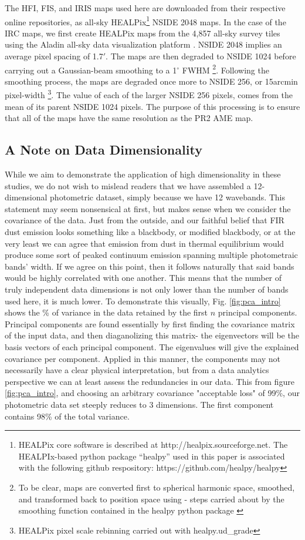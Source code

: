       The HFI, FIS, and IRIS maps used here are downloaded from their respective online repositories, as all-sky HEALPix\footnote{HEALPix core software is described at http://healpix.sourceforge.net. The HEALPIx-based python package ``healpy'' used in this paper is associated with the following github respository: https://github.com/healpy/healpy} \citep{gorski05} NSIDE 2048 maps. In the case of the IRC maps, we first create HEALPix maps from the 4,857 all-sky survey tiles using the Aladin all-sky data visualization platform \citep{bonnarel00}. NSIDE 2048 implies an average pixel spacing of 1.7$'$. The maps are then degraded to NSIDE 1024 before carrying out a Gaussian-beam smoothing to a 1$^{\circ}$ FWHM \footnote{To be clear, maps are converted first to spherical harmonic space, smoothed, and transformed back to position space using - steps carried about by the smoothing function contained in the healpy python package \cite{healpy}}. Following the smoothing process, the maps are degraded once more to NSIDE 256, or 15arcmin pixel-width \footnote{HEALPix pixel scale rebinning carried out with healpy.ud\_grade}. The value of each of the larger NSIDE 256 pixels, comes from the mean of its parent NSIDE 1024 pixels. The purpose of this processing is to ensure that all of the maps have the same resolution as the PR2 AME map.

\subsection{A Note on Data Dimensionality}

While we aim to demonstrate the application of high dimensionality in these studies, we do not wish to mislead readers that we have assembled a 12-dimensional photometric dataset, simply because we have 12 wavebands. This statement may seem nonsensical at first, but makes sense when we consider the covariance of the data. Just from the outside, and our faithful belief that FIR dust emission looks something like a blackbody, or modified blackbody, or at the very least we can agree that emission from dust in thermal equilibrium would produce some sort of peaked continuum emission spanning multiple photometraic bands' width. If we agree on this point, then it follows naturally that said bands would be highly correlated with one another. This means that the number of truly independent data dimensions is not only lower than the number of bands used here, it is much lower. To demonstrate this visually, Fig. \ref{fig:pca_intro} shows the \% of variance in the data retained by the first $n$ principal components. Principal components are found essentially by first finding the covariance matrix of the input data, and then diaganolizing this matrix- the eigenvectors will be the basis vectors of each principal component. The eigenvalues will give the explained covariance per component. Applied in this manner, the components may not necessarily have a clear physical interpretation, but from a data analytics perspective we can at least assess the redundancies in our data. This from figure \ref{fig:pca_intro}, and choosing an arbitrary covariance "acceptable loss" of 99\%, our photometric data set steeply reduces to 3 dimensions. The first component contains 98\% of the total variance.


